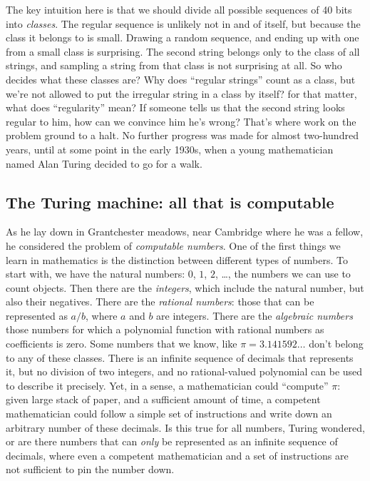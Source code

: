 The key intuition here is that we should divide all possible sequences of 40 bits into \emph{classes}. The regular sequence is unlikely not in and of itself, but because the class it belongs to is small. Drawing a random sequence, and ending up with one from a small class is surprising. The second string belongs only to the class of all strings, and sampling a string from that class is not surprising at all.
So who decides what these classes are? Why does ``regular strings'' count as a class, but we're not allowed to put the irregular string in a class by itself? for that matter, what does ``regularity'' mean? If someone tells us that the second string looks regular to him, how can we convince him he's wrong? That's where work on the problem ground to a halt. No further progress was made for almost two-hundred years, until at some point in the early 1930s, when a young mathematician named Alan Turing decided to go for a walk.

\subsection*{The Turing machine: all that is computable}

As he lay down in Grantchester meadows, near Cambridge where he was a fellow, he considered the problem of \emph{computable numbers}. One of the first things we learn in mathematics is the distinction between different types of numbers. To start with, we have the natural numbers: $0$, $1$, $2$, \ldots, the numbers we can use to count objects. Then there are the \emph{integers}, which include the natural number, but also their negatives. There are the \emph{rational numbers}: those that can be represented as $a/b$, where $a$ and $b$ are integers. There are the \emph{algebraic numbers} those numbers for which a polynomial function with rational numbers as coefficients is zero. Some numbers that we know, like $\pi = 3.141592\ldots$ don't belong to any of these classes. There is an infinite sequence of decimals that represents it, but no division of two integers, and no rational-valued polynomial can be used to describe it precisely. Yet, in a sense, a mathematician could ``compute'' $\pi$: given large stack of paper, and a sufficient amount of time, a competent mathematician could follow a simple set of instructions and write down an arbitrary number of these decimals. Is this true for all numbers, Turing wondered, or are there numbers that can \emph{only} be represented as an infinite sequence of decimals, where even a competent mathematician and a set of instructions are not sufficient to pin the number down.


